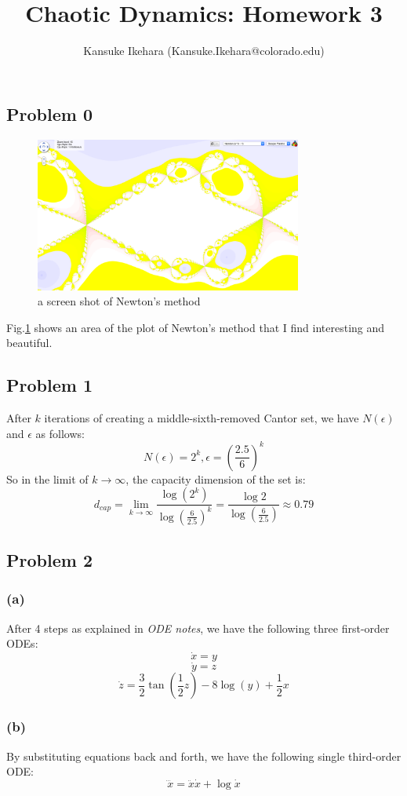 \documentclass{article}
\title{Chaotic Dynamics: Homework 3}
\author{Kansuke Ikehara (Kansuke.Ikehara@colorado.edu)}
\begin{document}
\maketitle

\subsection*{Problem 0}
\begin{figure}[hb]
	\centering
	\includegraphics[height=2in]{figs/screen_shot.png}
	\caption{a screen shot of Newton's method}
	\label{screen_shot}
\end{figure}
Fig.\ref{screen_shot} shows an area of the plot of Newton's method that I find interesting and beautiful.

\subsection*{Problem 1}
After $k$ iterations of creating a middle-sixth-removed Cantor set, we have $N(\epsilon)$ and $\epsilon$ as follows:
\[
	N(\epsilon) = 2^{k}, \epsilon = \left( \frac{2.5}{6} \right)^k
\]
So in the limit of $k  \to \infty$, the capacity dimension of the set is:
\[
	d_{cap} = \lim_{k  \to \infty}\frac{\log(2^k)}{\log\left( \frac{6}{2.5} \right)^k} = \frac{\log2}{\log\left( \frac{6}{2.5} \right)} \approx 0.79
\]

\subsection*{Problem 2}
\subsubsection*{(a)}
After 4 steps as explained in \textit{ODE notes}, we have the following three first-order ODEs:
\[
	\dot{x} = y
\]
\[
	\dot{y} = z
\]
\[
	\dot{z} = \frac{3}{2}\tan\left( \frac{1}{2}z\right) -8\log(y) + \frac{1}{2}x
\]
\subsubsection*{(b)}
By substituting equations back and forth, we have the following single third-order ODE:
\[
	\dddot{x} = \ddot{x}\dot{x} + \log{\dot{x}}
\]
\end{document}

